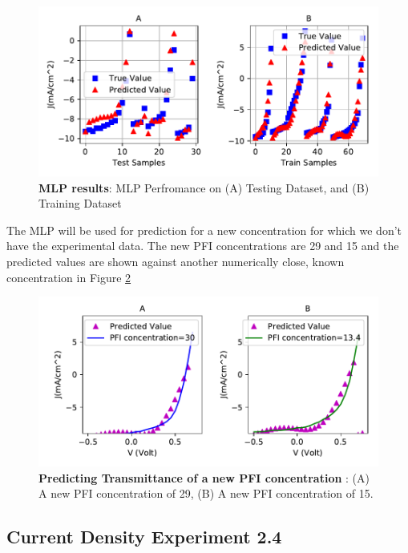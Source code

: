 \documentclass[]{article}
\begin{document}
\begin{figure}
\centering
\includegraphics{Report_files/figure-latex/JVplot2-1.pdf}
\caption{\label{fig:JVplot2}\textbf{MLP results}: MLP Perfromance on (A) Testing Dataset, and (B) Training Dataset}
\end{figure}

The MLP will be used for prediction for a new concentration for which we don't have the experimental data. The new PFI concentrations are 29 and 15 and the predicted values are shown against another numerically close, known concentration in Figure \ref{fig:JVnew}

\begin{figure}
\centering
\includegraphics{Report_files/figure-latex/JVnew-1.pdf}
\caption{\label{fig:JVnew}\textbf{Predicting Transmittance of a new PFI concentration }: (A) A new PFI concentration of 29, (B) A new PFI concentration of 15.}
\end{figure}

\newpage

\hypertarget{current-density-experiment-2.4}{%
\subsection{Current Density Experiment 2.4}\label{current-density-experiment-2.4}}
\end{document}
